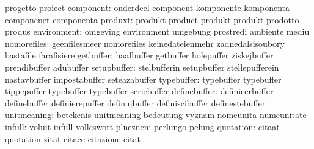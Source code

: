                                   progetto                         proiect
                       component: onderdeel                        component
                                  komponente                       komponenta
                                  componenet                       componenta
                         produxt: produkt                          product
                                  produkt                          produkt
                                  prodotto                         produs
                     environment: omgeving                         environment
                                  umgebung                         prostredi
                                  ambiente                         mediu
                     nomorefiles: geenfilesmeer                    nomorefiles
                                  keinedateienmehr                 zadnedalsisoubory
                                  bastafile                        farafisiere
                       getbuffer: haalbuffer                       getbuffer
                                  holepuffer                       ziskejbuffer
                                  prendibuffer                     adubuffer
                     setupbuffer: stelbufferin                     setupbuffer
                                  stellepufferein                  nastavbuffer
                                  impostabuffer                    seteazabuffer
                      typebuffer: typebuffer                       typebuffer
                                  tippepuffer                      typebuffer
                                  typebuffer                       scriebuffer %
                    definebuffer: definieerbuffer                  definebuffer
                                  definierepuffer                  definujbuffer
                                  definiscibuffer                  definestebuffer
                     unitmeaning: betekenis                        unitmeaning
                                  bedeutung                        vyznam
                                  nomeunita                        numeunitate %
                          infull: voluit                           infull
                                  volleswort                       plnezneni
                                  perlungo                         pelung
                       quotation: citaat                           quotation
                                  zitat                            citace
                                  citazione                        citat
